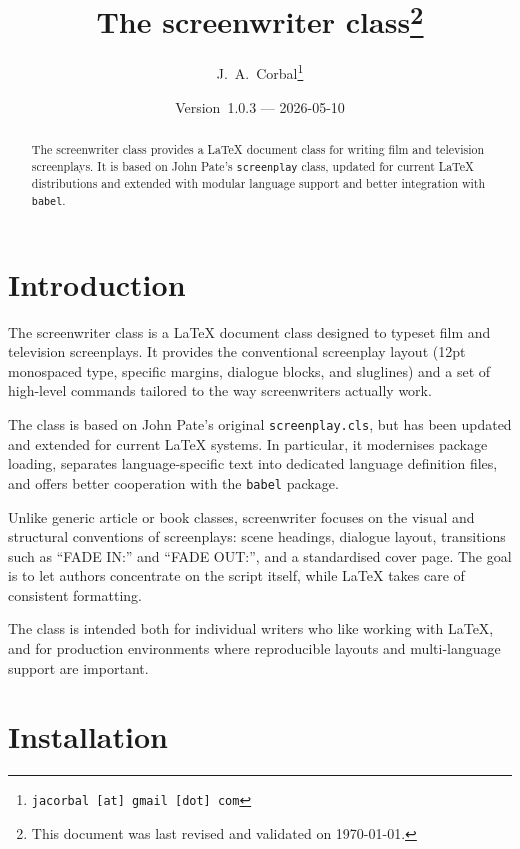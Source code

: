 \documentclass[letterpaper]{article}
\title{The \textsf{screenwriter} class\thanks{This document was last
    revised and validated on \today.}}
\author{J.~A.~Corbal\thanks{\texttt{jacorbal [at] gmail [dot] com}}}
\date{Version~1.0.3 --- 2026-05-10}
\begin{document}

\maketitle

\begin{abstract}

    The \textsf{screenwriter} class provides a LaTeX document class for
    writing film and television screenplays.  It is based on John Pate's
    \texttt{screenplay} class, updated for current LaTeX distributions
    and extended with modular language support and better integration
    with \texttt{babel}.

\end{abstract}

\section{Introduction}%

The \textsf{screenwriter} class is a \LaTeX{} document class designed to
typeset film and television screenplays.  It provides the conventional
screenplay layout (12\nobreak\thinspace pt monospaced type, specific
margins, dialogue blocks, and sluglines) and a set of high-level
commands tailored to the way screenwriters actually work.

The class is based on John Pate's original \texttt{screenplay.cls}, but
has been updated and extended for current \LaTeX{} systems.  In
particular, it modernises package loading, separates language-specific
text into dedicated language definition files, and offers better
cooperation with the \texttt{babel} package.

Unlike generic article or book classes, \textsf{screenwriter} focuses on
the visual and structural conventions of screenplays: scene headings,
dialogue layout, transitions such as ``FADE IN:'' and ``FADE OUT:'', and
a standardised cover page.  The goal is to let authors concentrate on
the script itself, while \LaTeX{} takes care of consistent formatting.

The class is intended both for individual writers who like working with
\LaTeX, and for production environments where reproducible layouts and
multi-language support are important.


\section{Installation}%
\end{document}
